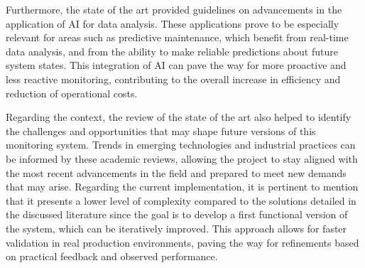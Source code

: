 Furthermore, the state of the art provided guidelines on advancements in the application of \gls{AI} for data analysis. These applications prove to be especially relevant for areas such as predictive maintenance, which benefit from real-time data analysis, and from the ability to make reliable predictions about future system states. This integration of AI can pave the way for more proactive and less reactive monitoring, contributing to the overall increase in efficiency and reduction of operational costs.

Regarding the context, the review of the state of the art also helped to identify the challenges and opportunities that may shape future versions of this monitoring system. Trends in emerging technologies and industrial practices can be informed by these academic reviews, allowing the project to stay aligned with the most recent advancements in the field and prepared to meet new demands that may arise.
Regarding the current implementation, it is pertinent to mention that it presents a lower level of complexity compared to the solutions detailed in the discussed literature since the goal is to develop a first functional version of the system, which can be iteratively improved. This approach allows for faster validation in real production environments, paving the way for refinements based on practical feedback and observed performance.